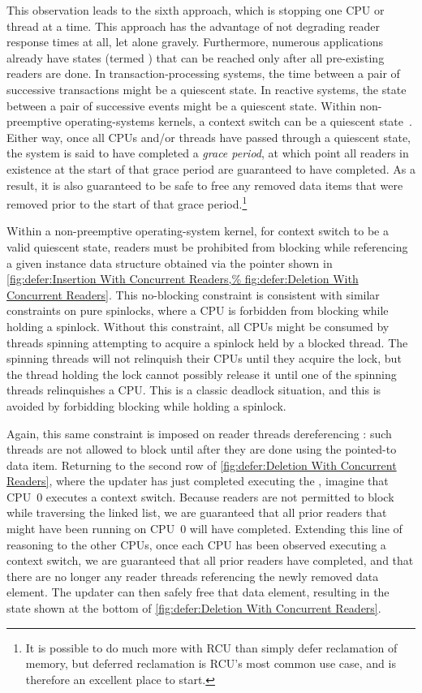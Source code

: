 This observation leads to the sixth approach, which is stopping
one CPU or thread at a time.
This approach has the advantage of not degrading reader response times
at all, let alone gravely.
Furthermore, numerous applications already have states (termed
\emph{}) that can be
reached only after all pre-existing readers are done.
In transaction-processing systems, the time between a pair of
successive transactions might be a quiescent state.
In reactive systems, the state between a pair of successive events
might be a quiescent state.
Within non-preemptive operating-systems kernels, a context switch can be
a quiescent state~\cite{McKenney98}.
Either way, once all CPUs and/or threads have passed through a quiescent
state, the system is said to have completed a \emph{grace period},
at which point all readers in existence at the start of that grace period
are guaranteed to have completed.
As a result, it is also guaranteed to be safe to free any removed data
items that were removed prior to the start of that grace period.\footnote{
	It is possible to do much more with RCU than simply defer
	reclamation of memory, but deferred reclamation is RCU's most
	common use case, and is therefore an excellent place to start.}

Within a non-preemptive operating-system kernel, for context switch to be
a valid quiescent state, readers must be prohibited from blocking while
referencing a given instance data structure obtained via the 
pointer shown in
\cref{fig:defer:Insertion With Concurrent Readers,%
fig:defer:Deletion With Concurrent Readers}.
This no-blocking constraint is consistent with similar constraints
on pure spinlocks, where a CPU is forbidden from blocking while
holding a spinlock.
Without this constraint, all CPUs might be consumed by threads
spinning attempting to acquire a spinlock held by a blocked thread.
The spinning threads will not relinquish their CPUs until they acquire
the lock, but the thread holding the lock cannot possibly release it
until one of the spinning threads relinquishes a CPU\@.
This is a classic deadlock situation, and this  is avoided
by forbidding blocking while holding a spinlock.

Again, this same constraint is imposed on reader threads dereferencing
: such threads are not allowed to block until after
they are done using the pointed-to data item.
Returning to the second row of
\cref{fig:defer:Deletion With Concurrent Readers},
where the updater has just completed executing the ,
imagine that CPU~0 executes a context switch.
Because readers are not permitted to block while traversing the linked
list, we are guaranteed that all prior readers that might have been running on
CPU~0 will have completed.
Extending this line of reasoning to the other CPUs, once each CPU has
been observed executing a context switch, we are guaranteed that all
prior readers have completed, and that there are no longer any reader
threads referencing the newly removed data element.
The updater can then safely free that data element, resulting in the
state shown at the bottom of
\cref{fig:defer:Deletion With Concurrent Readers}.

